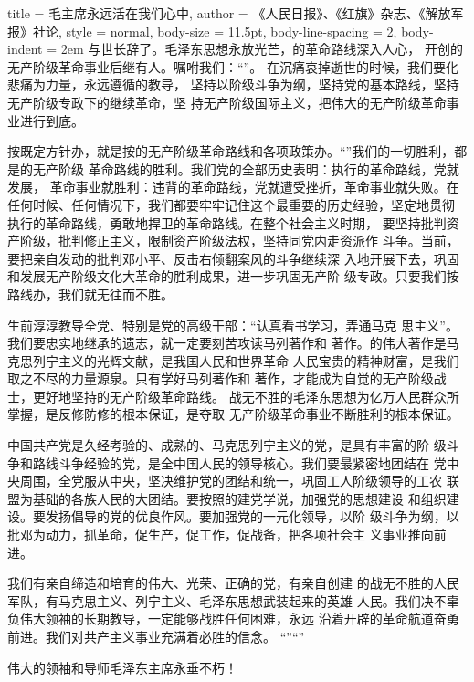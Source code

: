 \begin{hongqiarticle}{
        title  = {毛主席永远活在我们心中},
        author = {《人民日报》、《红旗》杂志、《解放军报》社论},
        style  = normal,
        body-size = 11.5pt,
        body-line-spacing = 2,
        body-indent = 2em
    }
    与世长辞了。毛泽东思想永放光芒，的革命路线深入人心，
    开创的无产阶级革命事业后继有人。嘱咐我们：“”。
    在沉痛哀掉逝世的时候，我们要化悲痛为力量，永远遵循的教导，
    坚持以阶级斗争为纲，坚持党的基本路线，坚持无产阶级专政下的继续革命，坚
    持无产阶级国际主义，把伟大的无产阶级革命事业进行到底。
    
    按既定方针办，就是按的无产阶级革命路线和各项政策办。“”我们的一切胜利，都是的无产阶级
    革命路线的胜利。我们党的全部历史表明：执行的革命路线，党就发展，
    革命事业就胜利：违背的革命路线，党就遭受挫折，革命事业就失败。在
    任何时候、任何情况下，我们都要牢牢记住这个最重要的历史经验，坚定地贯彻
    执行的革命路线，勇敢地捍卫的革命路线。在整个社会主义时期，
    要坚持批判资产阶级，批判修正主义，限制资产阶级法权，坚持同党内走资派作
    斗争。当前，要把亲自发动的批判邓小平、反击右倾翻案风的斗争继续深
    入地开展下去，巩固和发展无产阶级文化大革命的胜利成果，进一步巩固无产阶
    级专政。只要我们按路线办，我们就无往而不胜。
    
    生前淳淳教导全党、特别是党的高级干部：\yulu“{认真看书学习，弄通马克
    思主义}”。我们要忠实地继承的遗志，就一定要刻苦攻读马列著作和
    著作。的伟大著作是马克思列宁主义的光辉文献，是我国人民和世界革命
    人民宝贵的精神财富，是我们取之不尽的力量源泉。只有学好马列著作和
    著作，才能成为自觉的无产阶级战士，更好地坚持的无产阶级革命路线。
    战无不胜的毛泽东思想为亿万人民群众所掌握，是反修防修的根本保证，是夺取
    无产阶级革命事业不断胜利的根本保证。
    
    中国共产党是久经考验的、成熟的、马克思列宁主义的党，是具有丰富的阶
    级斗争和路线斗争经验的党，是全中国人民的领导核心。我们要最紧密地团结在
    党中央周围，全党服从中央，坚决维护党的团结和统一，巩固工人阶级领导的工农
    联盟为基础的各族人民的大团结。要按照的建党学说，加强党的思想建设
    和组织建设。要发扬倡导的党的优良作风。要加强党的一元化领导，以阶
    级斗争为纲，以批邓为动力，抓革命，促生产，促工作，促战备，把各项社会主
    义事业推向前进。
    
    我们有亲自缔造和培育的伟大、光荣、正确的党，有亲自创建
    的战无不胜的人民军队，有马克思主义、列宁主义、毛泽东思想武装起来的英雄
    人民。我们决不辜负伟大领袖的长期教导，一定能够战胜任何困难，永远
    沿着开辟的革命航道奋勇前进。我们对共产主义事业充满着必胜的信念。
    “”“”
    
    伟大的领袖和导师毛泽东主席永垂不朽！
\end{hongqiarticle}